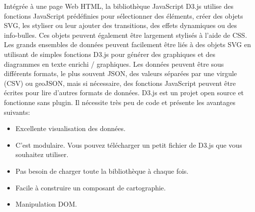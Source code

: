 \documentclass[french, a4paper, 12pt]{report}
\begin{document}
Intégrée à une page Web HTML, la bibliothèque JavaScript D3.js utilise des fonctions JavaScript prédéfinies pour sélectionner des éléments, créer des objets SVG, les styliser ou leur ajouter des transitions, des effets dynamiques ou des info-bulles. Ces objets peuvent également être largement stylisés à l'aide de CSS. Les grands ensembles de données peuvent facilement être liés à des objets SVG en utilisant de simples fonctions D3.js pour générer des graphiques et des diagrammes en texte enrichi / graphiques. Les données peuvent être sous différents formats, le plus souvent JSON, des valeurs séparées par une virgule (CSV) ou geoJSON, mais si nécessaire, des fonctions JavaScript peuvent être écrites pour lire d'autres formats de données.
D3.js est un projet open source et fonctionne sans plugin. Il nécessite très peu de code et présente les avantages suivants:
\begin{itemize}
    \item Excellente visualisation des données.
    \item C'est modulaire. Vous pouvez télécharger un petit fichier de D3.js que vous souhaitez utiliser.
    \item Pas besoin de charger toute la bibliothèque à chaque fois.
    \item Facile à construire un composant de cartographie.
    \item Manipulation DOM.
\end{itemize}
\end{document}
